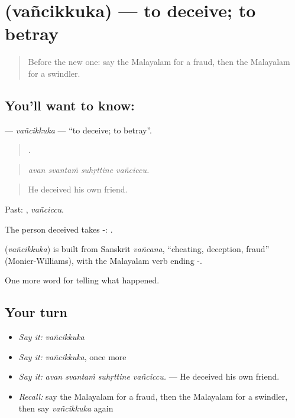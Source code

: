 \section[\texorpdfstring{\ml{വഞ്ചിക്കുക} (vañcikkuka)}{വഞ്ചിക്കുക (vañcikkuka)}]{ (vañcikkuka) — to deceive; to betray}

\label{lesson:ML-C372-vancikkuka}



\begin{quote}
Before the new one: say the Malayalam for a fraud, then the Malayalam for a swindler.
\end{quote}

\subsection*{You'll want to know: }
\textbf{} — \emph{vañcikkuka} — \textquotedblleft{}to deceive; to betray\textquotedblright{}.

\begin{quote}
   .
\end{quote}

\begin{quote}
\emph{avan svantaṁ suhṛttine vañciccu.}
\end{quote}

\begin{quote}
He deceived his own friend.
\end{quote}

Past: , \emph{vañciccu}.

The person deceived takes -:  .

\begin{cousinweb}
\textbf{} (\emph{vañcikkuka}) is built from Sanskrit \emph{vañcana}, \textquotedblleft{}cheating, deception, fraud\textquotedblright{} (Monier-Williams), with the Malayalam verb ending -.
\end{cousinweb}

\begin{grammarlens}[title={What you've built}]
One more word for telling what happened.
\end{grammarlens}

\subsection*{Your turn}
\begin{itemize}
\raggedright
  \item \emph{Say it:} \emph{vañcikkuka}
  \item \emph{Say it:} \emph{vañcikkuka}, once more
  \item \emph{Say it:} \emph{avan svantaṁ suhṛttine vañciccu.} — He deceived his own friend.
  \item \emph{Recall:} say the Malayalam for a fraud, then the Malayalam for a swindler, then say \emph{vañcikkuka} again
\end{itemize}

